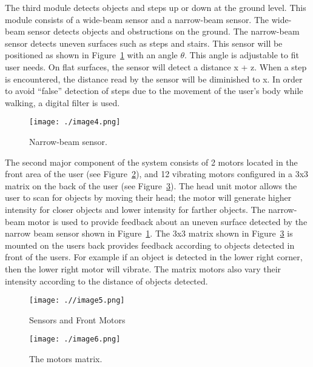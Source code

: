The third module detects objects and steps up or down at the ground
level. This module consists of a wide-beam sensor and a narrow-beam
sensor. The wide-beam sensor detects objects and obstructions on the
ground. The narrow-beam sensor detects uneven surfaces such as steps and
stairs. This sensor will be positioned as shown in 
Figure~\ref{figure:caseStudyNarrowBeam} with an
angle $\theta$. This angle is adjustable to fit user needs. On flat surfaces,
the sensor will detect a distance x + z. When a step is encountered, the
distance read by the sensor will be diminished to x. In order to avoid
``false'' detection of steps due to the movement of the user's body
while walking, a digital filter is used.

\begin{figure}[h]
\centering
\texttt{[image: ./image4.png]}
\caption{Narrow-beam sensor.}
\label{figure:caseStudyNarrowBeam}
\end{figure}


The second major component of the system consists of 2 motors located in
the front area of the user (see Figure~\ref{figure:caseStudySensorMotors}), 
and 12 vibrating motors
configured in a 3x3 matrix on the back of the user (see 
Figure~\ref{figure:caseStudyMotorMatrix}). The
head unit motor allows the user to scan for objects by moving their
head; the motor will generate higher intensity for closer objects and
lower intensity for farther objects. The narrow-beam motor is used to
provide feedback about an uneven surface detected by the narrow beam
sensor shown in Figure~\ref{figure:caseStudyNarrowBeam}. 
The 3x3 matrix shown in 
Figure~\ref{figure:caseStudyMotorMatrix} is mounted on
the users back provides feedback according to objects detected in front
of the users. For example if an object is detected in the lower right
corner, then the lower right motor will vibrate. The matrix motors also
vary their intensity according to the distance of objects detected.

\begin{figure}[h]
\centering
\texttt{[image: .//image5.png]}
\caption{Sensors and Front Motors}
\label{figure:caseStudySensorMotors}
\end{figure}


\begin{figure}[h]
\centering
\texttt{[image: ./image6.png]}
\caption{The motors matrix.}
\label{figure:caseStudyMotorMatrix}
\end{figure}

